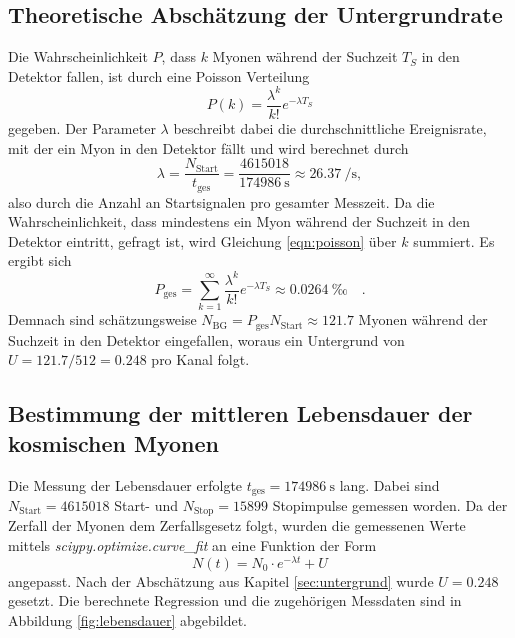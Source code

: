 \subsection*{Theoretische Abschätzung der Untergrundrate}
\label{sec:untergrund}
Die Wahrscheinlichkeit $P$, dass $k$ Myonen während der Suchzeit $T_S$ in den Detektor fallen, ist durch eine Poisson Verteilung
\begin{equation}
  P(k)=\frac{\lambda^k}{k!}e^{-\lambda T_S} \label{eqn:poisson}
\end{equation}
gegeben. Der Parameter $\lambda$ beschreibt dabei die durchschnittliche Ereignisrate, mit der ein Myon in den Detektor fällt und wird berechnet durch 
\begin{equation}
  \lambda=\frac{N_\text{Start}}{t_\text{ges}}=\frac{\num{4615018}}{\SI{174986}{\second}}\approx \SI{26.37}{\per\second},
\end{equation}
also durch die Anzahl an Startsignalen pro gesamter Messzeit. Da die Wahrscheinlichkeit, dass mindestens ein Myon während der Suchzeit in den Detektor eintritt,
gefragt ist, wird Gleichung \ref{eqn:poisson} über $k$ summiert. Es ergibt sich
\begin{equation*}
  P_{\text{ges}}=\sum_{k=1}^\infty\frac{\lambda^k}{k!}e^{-\lambda T_S}\approx\SI{0.0264}{‰}\quad .
\end{equation*}
Demnach sind schätzungsweise $N_{\text{BG}}=P_{\text{ges}}N_{\text{Start}}\approx\num{121.7}$ Myonen während der Suchzeit in den Detektor eingefallen, woraus ein Untergrund
von $U=121.7/512=0.248$ pro Kanal folgt.

\subsection*{Bestimmung der mittleren Lebensdauer der kosmischen Myonen}
\label{sec:lebensdauer}
Die Messung der Lebensdauer erfolgte $t_\text{ges}=\SI{174986}{\second}$ lang. Dabei sind $N_\text{Start}=\num{4615018}$ Start- und  $N_\text{Stop}=\num{15899}$
Stopimpulse gemessen worden. 
\noindent
Da der Zerfall der Myonen dem Zerfallsgesetz folgt, wurden die gemessenen Werte mittels \textit{sciypy.optimize.curve\_fit} an eine Funktion der Form 
\begin{equation}
  N(t)=N_0\cdot e^{-\lambda t}+U \label{eqn:expo}
\end{equation}
angepasst. Nach der Abschätzung aus Kapitel \ref{sec:untergrund} wurde $U=0.248$ gesetzt. Die berechnete Regression und die zugehörigen Messdaten sind in Abbildung 
\ref{fig:lebensdauer} abgebildet.

